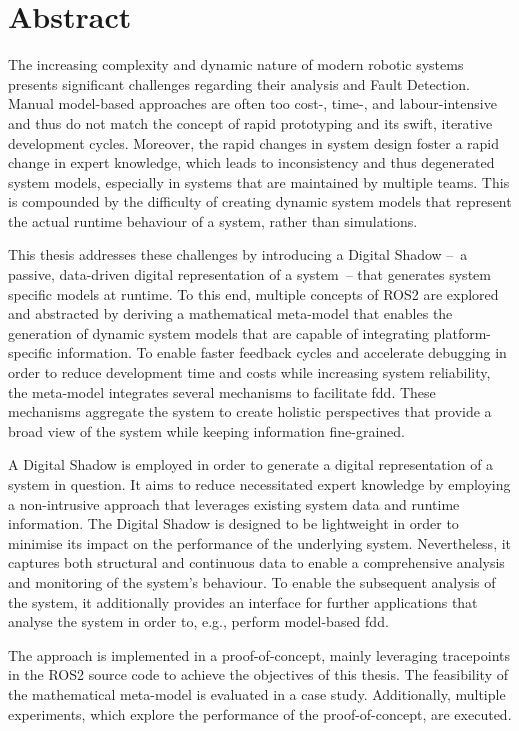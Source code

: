 \chapter*{Abstract} \label{chap:abstract}

The increasing complexity and dynamic nature of modern robotic systems presents significant challenges regarding their analysis and Fault Detection. Manual model-based approaches are often too cost-, time-, and labour-intensive and thus do not match the concept of rapid prototyping and its swift, iterative development cycles. Moreover, the rapid changes in system design foster a rapid change in expert knowledge, which leads to inconsistency and thus degenerated system models, especially in systems that are maintained by multiple teams. This is compounded by the difficulty of creating dynamic system models that represent the actual runtime behaviour of a system, rather than simulations.

This thesis addresses these challenges by introducing a Digital Shadow --~a passive, data-driven digital representation of a system~-- that generates system specific models at runtime. To this end, multiple concepts of ROS2 are explored and abstracted by deriving a mathematical meta-model that enables the generation of dynamic system models that are capable of integrating platform-specific information. To enable faster feedback cycles and accelerate debugging in order to reduce development time and costs while increasing system reliability, the meta-model integrates several mechanisms to facilitate \acl{fdd}. These mechanisms aggregate the system to create holistic perspectives that provide a broad view of the system while keeping information fine-grained.

A Digital Shadow is employed in order to generate a digital representation of a system in question. It aims to reduce necessitated expert knowledge by employing a non-intrusive approach that leverages existing system data and runtime information. The Digital Shadow is designed to be lightweight in order to minimise its impact on the performance of the underlying system. Nevertheless, it captures both structural and continuous data to enable a comprehensive analysis and monitoring of the system's behaviour. To enable the subsequent analysis of the system, it additionally provides an interface for further applications that analyse the system in order to, e.g., perform model-based \acl{fdd}.

The approach is implemented in a proof-of-concept, mainly leveraging tracepoints in the ROS2 source code to achieve the objectives of this thesis. The feasibility of the mathematical meta-model is evaluated in a case study. Additionally, multiple experiments, which explore the performance of the proof-of-concept, are executed.

